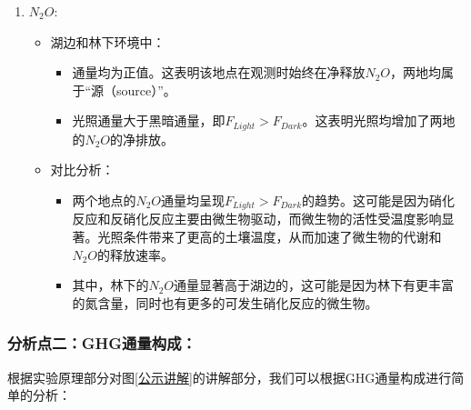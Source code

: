 \documentclass[10.5pt]{config}
\begin{document}
\begin{enumerate}
    \item $N_2O$:
    \begin{itemize}
        \item 湖边和林下环境中：
        \begin{itemize}
            \item 通量均为正值。这表明该地点在观测时始终在净释放$N_2O$，两地均属于“源（source）”。
            \item 光照通量大于黑暗通量，即$F_{Light}>F_{Dark}$。这表明光照均增加了两地的$N_2O$的净排放。
        \end{itemize}
        \item 对比分析：
        \begin{itemize}
            \item 两个地点的$N_2O$通量均呈现$F_{Light}>F_{Dark}$的趋势。这可能是因为硝化反应和反硝化反应主要由微生物驱动，而微生物的活性受温度影响显著。光照条件带来了更高的土壤温度，从而加速了微生物的代谢和$N_2O$的释放速率。
            \item 其中，林下的$N_2O$通量显著高于湖边的，这可能是因为林下有更丰富的氮含量，同时也有更多的可发生硝化反应的微生物。
        \end{itemize}
        \end{itemize}
\end{enumerate}

\subsubsection*{\textbf{分析点二：GHG通量构成：}}

根据实验原理部分对图\ref{公示讲解}的讲解部分，我们可以根据GHG通量构成进行简单的分析：
\end{document}
